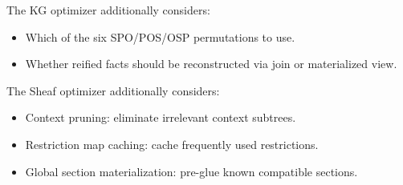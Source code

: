 The KG optimizer additionally considers:
\begin{itemize}
    \item Which of the six SPO/POS/OSP permutations to use.
    \item Whether reified facts should be reconstructed via join or
          materialized view.
\end{itemize}

The Sheaf optimizer additionally considers:
\begin{itemize}
    \item Context pruning: eliminate irrelevant context subtrees.
    \item Restriction map caching: cache frequently used restrictions.
    \item Global section materialization: pre-glue known compatible sections.
\end{itemize}
